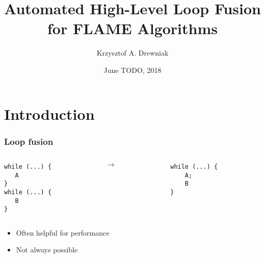 \documentclass{beamer}
\title[Loop fusion]{Automated High-Level Loop Fusion for FLAME Algorithms}
\author[Drewniak]{Krzysztof A. Drewniak}
\institute[CMU]{Carnegie Mellon University}
\date[]{June TODO, 2018}
\begin{document}
\begin{frame}[plain]
  \titlepage{}
\end{frame}

\section{Introduction}

\begin{frame}[fragile]
  \frametitle{Loop fusion}
  \begin{columns}
    \begin{column}{0.45\textwidth}
\begin{verbatim}
while (...) {
   A
}
while (...) {
   B
}
\end{verbatim}
    \end{column}
    \begin{column}{0.1\textwidth}
      {\Large $\to$}
    \end{column}
    \begin{column}{0.45\textwidth}
\begin{verbatim}
while (...) {
    A;
    B
}
\end{verbatim}
    \end{column}
  \end{columns}

  \vspace*{2em}
  \begin{itemize}
  \item Often helpful for performance
  \item Not always possible
  \end{itemize}
\end{frame}
\end{document}
